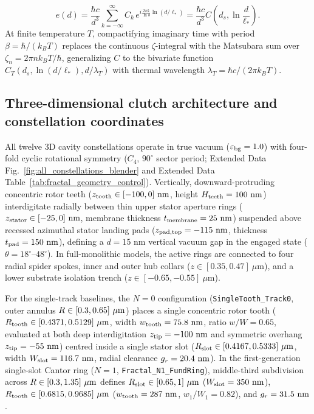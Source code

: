 \documentclass[pdflatex,sn-nature]{sn-jnl}
\begin{document}
\begin{equation}
e(d) = \frac{\hbar c}{d^3} \sum_{k=-\infty}^{\infty} C_k \, e^{i \frac{2\pi k}{\ln b} \ln(d/\ell_*)} = \frac{\hbar c}{d^3} C\!\left(d_s, \ln\frac{d}{\ell_*}\right).
\end{equation}
At finite temperature $T$, compactifying imaginary time with period $\beta = \hbar/(k_B T)$ replaces the continuous $\zeta$-integral with the Matsubara sum over $\zeta_n = 2\pi n k_B T/\hbar$, generalizing $C$ to the bivariate function $C_T(d_s, \ln(d/\ell_*), d/\lambda_T)$ with thermal wavelength $\lambda_T = \hbar c / (2\pi k_B T)$\cite{gordon2026prd}.

\subsection*{Three-dimensional clutch architecture and constellation coordinates}
All twelve 3D cavity constellations operate in true vacuum ($\varepsilon_{\rm bg}=1.0$) with four-fold cyclic rotational symmetry ($C_4$, $90^\circ$ sector period; Extended Data Fig.~\ref{fig:all_constellations_blender} and Extended Data Table~\ref{tab:fractal_geometry_control}). Vertically, downward-protruding concentric rotor teeth ($z_{\rm tooth} \in [-100, 0]\text{ nm}$, height $H_{\rm teeth} = 100\text{ nm}$) interdigitate radially between thin upper stator aperture rings ($z_{\rm stator} \in [-25, 0]\text{ nm}$, membrane thickness $t_{\rm membrane} = 25\text{ nm}$) suspended above recessed azimuthal stator landing pads ($z_{\rm pad,top} = -115\text{ nm}$, thickness $t_{\rm pad} = 150\text{ nm}$), defining a $d = 15\text{ nm}$ vertical vacuum gap in the engaged state ($\theta = 18^\circ\text{--}48^\circ$). In full-monolithic models, the active rings are connected to four radial spider spokes, inner and outer hub collars ($z \in [0.35, 0.47]\ \mu\text{m}$), and a lower substrate isolation trench ($z \in [-0.65, -0.55]\ \mu\text{m}$).

For the single-track baselines, the $N=0$ configuration (\texttt{SingleTooth\_Track0}, outer annulus $R \in [0.3{}, 0.65{}]\ \mu\text{m}$) places a single concentric rotor tooth ($R_{\rm tooth} \in [0.4371, 0.5129]\ \mu\text{m}$, width $w_{\rm tooth} = 75.8{}\text{ nm}$, ratio $w/W = 0.65$, evaluated at both deep interdigitation $z_{\rm tip} = -100\text{ nm}$ and symmetric overhang $z_{\rm tip} = -55\text{ nm}$) centred inside a single stator slot ($R_{\rm slot} \in [\SingletoothTrackzeroSlotRInUm{}, \SingletoothTrackzeroSlotROutUm{}]\ \mu\text{m}$, width $W_{\rm slot} = 116.7{}\text{ nm}$, radial clearance $g_r = 20.4{}\text{ nm}$). In the first-generation single-slot Cantor ring ($N=1$, \texttt{Fractal\_N1\_FundRing}), middle-third subdivision across $R \in [0.3{}, 1.35{}]\ \mu\text{m}$ defines $R_{\rm slot} \in [0.65{}, 1{}]\ \mu\text{m}$ ($W_{\rm slot} = 350{}\text{ nm}$), $R_{\rm tooth} \in [0.6815, 0.9685]\ \mu\text{m}$ ($w_{\rm tooth} = 287{}\text{ nm}$, $w_1/W_1 = 0.82$), and $g_r = 31.5{}\text{ nm}$.
\end{document}
